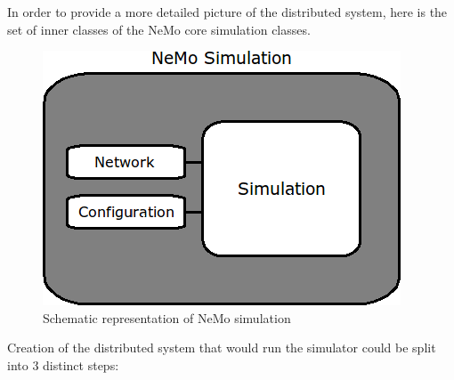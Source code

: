 In order to provide a more detailed picture of the distributed system, here is the set of inner classes of the NeMo core simulation classes.

\begin{figure}[h]
\begin{center}
\includegraphics[scale = 0.4]{images/nemo_simulation_schematic.png}
\end{center}
\caption{Schematic representation of NeMo simulation}
\end{figure}

Creation of the distributed system that would run the simulator could be split into 3 distinct steps:

